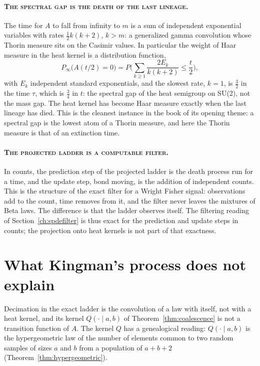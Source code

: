 \paragraph{\normalfont\scshape The spectral gap is the death of the last lineage.} The time for $A$ to fall from infinity to $m$ is a sum of independent exponential variables with rates $\frac12k(k+2)$, $k>m$: a generalized gamma convolution whose Thorin measure sits on the Casimir values. In particular the weight of Haar measure in the heat kernel is a distribution function,
\[
P_\infty\big(A(t/2)=0\big)=P\Big(\sum_{k\ge1}\frac{2E_k}{k(k+2)}\le\frac t2\Big),
\]
with $E_k$ independent standard exponentials, and the slowest rate, $k=1$, is $\frac32$ in the time $\tau$, which is $\frac34$ in $t$: the spectral gap of the heat semigroup on SU(2), not the mass gap. The heat kernel has become Haar measure exactly when the last lineage has died. This is the cleanest instance in the book of its opening theme: a spectral gap is the lowest atom of a Thorin measure, and here the Thorin measure is that of an extinction time.

\paragraph{\normalfont\scshape The projected ladder is a computable filter.} In counts, the prediction step of the projected ladder is the death process run for a time, and the update step, bond moving, is the addition of independent counts. This is the structure of the exact filter for a Wright Fisher signal: observations add to the count, time removes from it, and the filter never leaves the mixtures of Beta laws. The difference is that the ladder observes itself. The filtering reading of Section~\ref{ch:spdefilter} is thus exact for the prediction and update steps in counts; the projection onto heat kernels is not part of that exactness.

\section{What Kingman's process does not explain}

Decimation in the exact ladder is the convolution of a law with itself, not with a heat kernel, and its kernel $Q(\cdot\mid a,b)$ of Theorem~\ref{thm:coalescence} is not a transition function of $A$. The kernel $Q$ has a genealogical reading: $Q(\cdot\mid a,b)$ is the hypergeometric law of the number of elements common to two random samples of sizes $a$ and $b$ from a population of $a+b+2$ (Theorem~\ref{thm:hypergeometric}).

